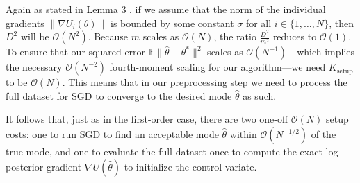 Again as stated in Lemma 3 \cite{baker2017}, if we assume that the norm of the individual gradients $\|\nabla U_i(\theta)\|$ is bounded by some constant $\sigma$ for all $i \in \{1, \ldots, N\}$, then $D^2$ will be $\mathcal{O}(N^2)$. Because $m$ scales as $\mathcal{O}(N)$, the ratio $\frac{D^2}{m^2}$ reduces to $\mathcal{O}(1)$. To ensure that our squared error $\mathbb{E}\|\hat\theta - \theta^*\|^2$ scales as $\mathcal{O}(N^{-1})$—which implies the necessary $\mathcal{O}(N^{-2})$ fourth-moment scaling for our algorithm—we need $K_{\text{setup}}$ to be $\mathcal{O}(N)$. This means that in our preprocessing step we need to process the full dataset for SGD to converge to the desired mode $\hat\theta$ as such.

It follows that, just as in the first-order case, there are two one-off $\mathcal{O}(N)$ setup costs: one to run SGD to find an acceptable mode $\hat\theta$ within $\mathcal{O}(N^{-1/2})$ of the true mode, and one to evaluate the full dataset once to compute the exact log-posterior gradient $\nabla U(\hat\theta)$ to initialize the control variate.
